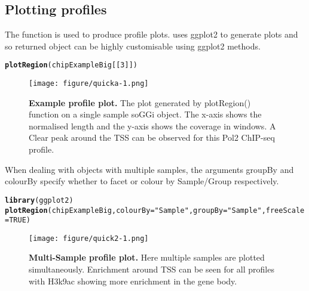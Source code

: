 \documentclass[12pt]{article}\usepackage[]{graphicx}\usepackage[usenames,dvipsnames]{color}
\makeatletter
\newcommand{\hlnum}[1]{\textcolor[rgb]{0.686,0.059,0.569}{#1}}%
\newcommand{\hlstr}[1]{\textcolor[rgb]{0.192,0.494,0.8}{#1}}%
\newcommand{\hlstd}[1]{\textcolor[rgb]{0.345,0.345,0.345}{#1}}%
\newcommand{\hlkwc}[1]{\textcolor[rgb]{0.333,0.667,0.333}{#1}}%
\newcommand{\hlkwd}[1]{\textcolor[rgb]{0.737,0.353,0.396}{\textbf{#1}}}%
\newenvironment{kframe}{%
 \def\at@end@of@kframe{}%
 \ifinner\ifhmode%
  \def\at@end@of@kframe{\end{minipage}}%
  \begin{minipage}{\columnwidth}%
 \fi\fi%
 \def\FrameCommand##1{\hskip\@totalleftmargin \hskip-\fboxsep
 \colorbox{shadecolor}{##1}\hskip-\fboxsep
     \hskip-\linewidth \hskip-\@totalleftmargin \hskip\columnwidth}%
 \MakeFramed {\advance\hsize-\width
   \@totalleftmargin\z@ \linewidth\hsize
   \@setminipage}}%
 {\par\unskip\endMakeFramed%
 \at@end@of@kframe}
\newenvironment{knitrout}{}{} %
\makeatother
\begin{document}
\subsection{Plotting profiles}

The  function is used to produce profile plots.  uses ggplot2 to generate plots and so returned object can be highly customisable using ggplot2 methods. 

\begin{knitrout}
\color{fgcolor}\begin{kframe}
\begin{alltt}
\hlkwd{plotRegion}\hlstd{(chipExampleBig[[}\hlnum{3}\hlstd{]])}
\end{alltt}
\end{kframe}
\end{knitrout}

\begin{figure}
\centering
\texttt{[image: figure/quicka-1.png]}
\caption{
  \textbf{Example profile plot.}
  The plot generated by plotRegion() function on a single sample soGGi object. The x-axis shows the normalised length and the y-axis shows the coverage in windows. A Clear peak around the TSS can be observed for this Pol2 ChIP-seq profile.
}
\label{Example-1}
\end{figure}


When dealing with objects with multiple samples, the arguments groupBy and colourBy specify whether to facet or colour by Sample/Group respectively.

\begin{knitrout}
\color{fgcolor}\begin{kframe}
\begin{alltt}
\hlkwd{library}\hlstd{(ggplot2)}
\hlkwd{plotRegion}\hlstd{(chipExampleBig,}\hlkwc{colourBy}\hlstd{=}\hlstr{"Sample"}\hlstd{,} \hlkwc{groupBy}\hlstd{=}\hlstr{"Sample"}\hlstd{,} \hlkwc{freeScale}\hlstd{=}\hlnum{TRUE}\hlstd{)}
\end{alltt}
\end{kframe}
\end{knitrout}


\begin{figure}
\centering
\texttt{[image: figure/quick2-1.png]}
\caption{
  \textbf{Multi-Sample profile plot.} 
  Here multiple samples are plotted simultaneously. Enrichment around TSS can be seen for all profiles with H3k9ac showing more enrichment in the gene body.
}
\label{multiplot}
\end{figure}
\end{document}
